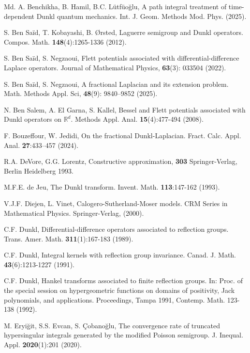 \documentclass[11pt,a4paper,reqno]{amsproc}
\theoremstyle{definition}
\theoremstyle{remark}
\numberwithin{equation}{section}
\begin{document}
\begin{thebibliography}{Md.}
 A. Benchikha, B. Hamil, B.C. L\"{u}tf\"{u}o\u{g}lu,  A path integral treatment of time-dependent Dunkl quantum mechanics. Int. J. Geom. Methods Mod. Phys. (2025).

 S. Ben Sa\"id,  T. Kobayashi, B. \O rsted,  Laguerre semigroup and Dunkl operators. Compos. Math. \textbf{148}(4):1265-1336 (2012).

S. Ben Sa\"id,  S. Negzaoui, Flett potentials associated with differential-difference Laplace operators. Journal of Mathematical Physics, \textbf{63}(3): 033504 (2022).

 S. Ben Sa\"id, S. Negzaoui, A fractional Laplacian and its extension problem. Math.
Methods Appl. Sci, \textbf{48}(9): 9840–9852 (2025).


 N. Ben Salem, A. El Garna,  S. Kallel,  Bessel and Flett potentials associated with Dunkl operators on $\mathbb{R}^d$. Methods Appl. Anal. \textbf{15}(4):477-494 (2008).

 F. Bouzeffour, W. Jedidi,  On the fractional Dunkl-Laplacian. Fract. Calc. Appl. Anal. \textbf{27}:433–457 (2024). 

 R.A. DeVore, G.G. Lorentz, Constructive approximation,  \textbf{303} Springer-Verlag, Berlin Heidelberg 1993.

 M.F.E. de Jeu, The Dunkl transform. Invent. Math. \textbf{113}:147-162 (1993).

 V.J.F. Diejen, L. Vinet,  Calogero-Sutherland-Moser models. CRM Series in Mathematical Physics. Springer-Verlag, (2000).

 C.F. Dunkl, Differential-difference operators associated to reflection groups. Trans. Amer. Math. \textbf{311}(1):167-183 (1989).

C.F. Dunkl, Integral kernels with reflection group invariance. Canad. J. Math. \textbf{43}(6):1213-1227 (1991).

 C.F. Dunkl, Hankel transforms associated to finite reflection groups. In: Proc. of the special session on hypergeometric functions on domains of positivity, Jack polynomials, and applications. Proceedings, Tampa 1991, Contemp. Math. 123- 138 (1992).


 M. Eryi\u{g}it, S.S. Evcan, S. \c{C}obano\u{g}lu,  The convergence rate of truncated hypersingular integrals generated by the modified Poisson semigroup. J. Inequal. Appl. \textbf{2020}(1):201 (2020).


\end{thebibliography}
\end{document}
